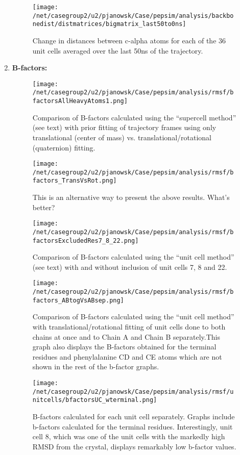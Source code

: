 \documentclass[12pt,letterpaper]{report}
\begin{document}
\begin{enumerate}
	\begin{figure}[H]
	\centering
	\texttt{[image: /net/casegroup2/u2/pjanowsk/Case/pepsim/analysis/backbonedist/distmatrices/bigmatrix\_last50to0ns]}
	\caption{Change in distances between c-alpha atoms for each of the 36 unit cells averaged over the last 50ns of the trajectory.}
	\end{figure}

\item \textbf{B-factors:}
	\begin{figure}[H]
	\centering
	\texttt{[image: /net/casegroup2/u2/pjanowsk/Case/pepsim/analysis/rmsf/bfactorsAllHeavyAtoms1.png]}
	\caption{Comparison of B-factors calculated using the ``supercell method'' (see text) with prior fitting of trajectory frames using only translational (center of mass) vs. translational/rotational (quaternion) fitting.}
	\end{figure}
	
	\begin{figure}[H]
	\centering
	\texttt{[image: /net/casegroup2/u2/pjanowsk/Case/pepsim/analysis/rmsf/bfactors\_TransVsRot.png]}
	\caption{This is an alternative way to present the above results. What's better?}
	\end{figure}

	\begin{figure}[H]
	\centering
	\texttt{[image: /net/casegroup2/u2/pjanowsk/Case/pepsim/analysis/rmsf/bfactorsExcludedRes7\_8\_22.png]}
	\caption{Comparison of B-factors calculated using the ``unit cell method'' (see text) with and without inclusion of unit cells 7, 8 and 22.}
	\end{figure}
	
	\begin{figure}[H]
	\centering
	\texttt{[image: /net/casegroup2/u2/pjanowsk/Case/pepsim/analysis/rmsf/bfactors\_ABtogVsABsep.png]}
	\caption{Comparison of B-factors calculated using the ``unit cell method'' with translational/rotational fitting of unit cells done to both chains at once and to Chain A and Chain B separately.This graph also displays the B-factors obtained for the terminal residues and phenylalanine CD and CE atoms which are not shown in the rest of the b-factor graphs.}
	\end{figure}

	\begin{figure}[H]
	\centering
	\texttt{[image: /net/casegroup2/u2/pjanowsk/Case/pepsim/analysis/rmsf/unitcells/bfactorsUC\_wterminal.png]}
	\caption{B-factors calculated for each unit cell separately. Graphs include b-factors calculated for the terminal residues. Interestingly, unit cell 8, which was one of the unit cells with the markedly high RMSD from the crystal, displays remarkably low b-factor values.}
	\end{figure}
	

\end{enumerate}
\end{document}
